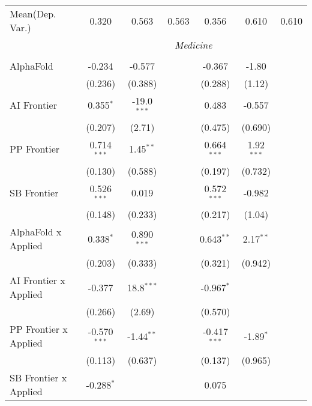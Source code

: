 \begin{tabular}{lcccccc}
Mean(Dep. Var.) & 0.320 & 0.563 & 0.563 & 0.356 & 0.610 & 0.610 \\
 & \multicolumn{6}{c}{\textit{Medicine}} \\ \\
   AlphaFold                      & -0.234         & -0.577        &               & -0.367         & -1.80        &   \\   
                                  & (0.236)        & (0.388)       &               & (0.288)        & (1.12)       &   \\   
   AI Frontier                    & 0.355$^{*}$    & -19.0$^{***}$ &               & 0.483          & -0.557       &   \\   
                                  & (0.207)        & (2.71)        &               & (0.475)        & (0.690)      &   \\   
   PP Frontier                    & 0.714$^{***}$  & 1.45$^{**}$   &               & 0.664$^{***}$  & 1.92$^{***}$ &   \\   
                                  & (0.130)        & (0.588)       &               & (0.197)        & (0.732)      &   \\   
   SB Frontier                    & 0.526$^{***}$  & 0.019         &               & 0.572$^{***}$  & -0.982       &   \\   
                                  & (0.148)        & (0.233)       &               & (0.217)        & (1.04)       &   \\   
   AlphaFold x Applied            & 0.338$^{*}$    & 0.890$^{***}$ &               & 0.643$^{**}$   & 2.17$^{**}$  &   \\   
                                  & (0.203)        & (0.333)       &               & (0.321)        & (0.942)      &   \\   
   AI Frontier x Applied          & -0.377         & 18.8$^{***}$  &               & -0.967$^{*}$   &              &   \\   
                                  & (0.266)        & (2.69)        &               & (0.570)        &              &   \\   
   PP Frontier x Applied          & -0.570$^{***}$ & -1.44$^{**}$  &               & -0.417$^{***}$ & -1.89$^{*}$  &   \\   
                                  & (0.113)        & (0.637)       &               & (0.137)        & (0.965)      &   \\   
   SB Frontier x Applied          & -0.288$^{*}$   &               &               & 0.075          &              &   \\   

\end{tabular}
